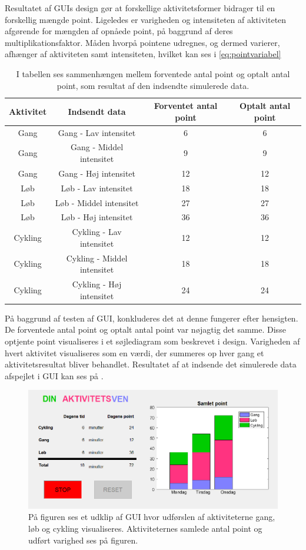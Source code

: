 Resultatet af GUIs design gør at forskellige aktivitetsformer bidrager til en forskellig mængde point. Ligeledes er varigheden og intensiteten  af aktiviteten afgørende for mængden af opnåede point, på baggrund af deres multiplikationsfaktor. Måden hvorpå pointene udregnes, og dermed varierer, afhænger af aktiviteten samt intensiteten, hvilket kan ses i \eqref{eq:pointvariabel}
\begin{table}[H]
	\centering
	\begin{tabular}{cccc}
		\hline
		\rowcolor[HTML]{C0C0C0} 
		Aktivitet & Indsendt data & Forventet antal point & Optalt antal point \\ \hline
		Gang 	& Gang - Lav intensitet 		& 6 & 6 \\ \hline
		Gang 	& Gang - Middel intensitet 		& 9 & 9 \\ \hline
		Gang 	& Gang - Høj intensitet 		& 12 & 12 \\ \hline
		Løb 	& Løb - Lav intensitet 			& 18 & 18 \\ \hline
		Løb 	& Løb - Middel intensitet 		& 27 & 27 \\ \hline
		Løb 	& Løb - Høj intensitet 			& 36 & 36 \\ \hline
		Cykling & Cykling - Lav intensitet 		& 12 & 12 \\ \hline
		Cykling & Cykling - Middel intensitet 	& 18 & 18 \\ \hline
		Cykling & Cykling - Høj intensitet 		& 24 & 24 \\ \hline
	\end{tabular}
	\caption{I tabellen ses sammenhængen mellem forventede antal point og optalt antal point, som resultat af den indsendte simulerede data.}
	\label{test:GUI}
\end{table}\vspace{-.5cm}
På baggrund af testen af GUI, konkluderes det at denne fungerer efter hensigten. De forventede antal point og optalt antal point var nøjagtig det samme. Disse optjente point visualiseres i et søjlediagram som beskrevet i design. Varigheden af hvert aktivitet visualiseres som en værdi, der summeres op hver gang et aktivitetsresultat bliver behandlet. Resultatet af at indsende det simulerede data afspejlet i GUI kan ses på .

\begin{figure}[H]
	\centering
	\includegraphics[scale=0.7]{figures/cDesign/test_GUI.png}
	\caption{På figuren ses et udklip af GUI hvor udførslen af aktiviteterne gang, løb og cykling visualiseres. Aktiviteternes samlede antal point og udført varighed ses på figuren.}
	\label{fig:GUI}
\end{figure}

